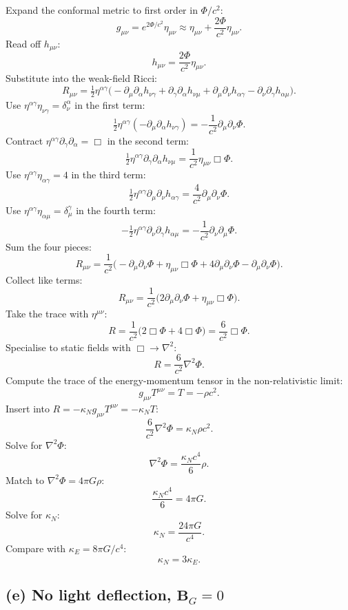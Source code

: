 \documentclass[11pt]{article}
\newcommand{\Lap}{\nabla^{2}}
\renewcommand{\vb}[1]{\mathbf{#1}}
\begin{document}
Expand the conformal metric to first order in $\Phi/c^{2}$:
\[
g_{\mu\nu}=e^{2\Phi/c^{2}}\eta_{\mu\nu}\approx \eta_{\mu\nu}+\frac{2\Phi}{c^{2}}\eta_{\mu\nu}.
\]
Read off $h_{\mu\nu}$:
\[
h_{\mu\nu}=\frac{2\Phi}{c^{2}}\eta_{\mu\nu}.
\]
Substitute into the weak-field Ricci:
\[
R_{\mu\nu}=\tfrac{1}{2}\eta^{\alpha\gamma}\bigl(-\partial_{\mu}\partial_{\alpha}h_{\nu\gamma}+\partial_{\gamma}\partial_{\alpha}h_{\nu\mu}+\partial_{\mu}\partial_{\nu}h_{\alpha\gamma}-\partial_{\nu}\partial_{\gamma}h_{\alpha\mu}\bigr).
\]
Use $\eta^{\alpha\gamma}\eta_{\nu\gamma}=\delta^{\alpha}_{\nu}$ in the first term:
\[
\tfrac{1}{2}\eta^{\alpha\gamma}(-\partial_{\mu}\partial_{\alpha}h_{\nu\gamma})=-\frac{1}{c^{2}}\partial_{\mu}\partial_{\nu}\Phi.
\]
Contract $\eta^{\alpha\gamma}\partial_{\gamma}\partial_{\alpha}=\Box$ in the second term:
\[
\tfrac{1}{2}\eta^{\alpha\gamma}\partial_{\gamma}\partial_{\alpha}h_{\nu\mu}=\frac{1}{c^{2}}\eta_{\mu\nu}\Box\Phi.
\]
Use $\eta^{\alpha\gamma}\eta_{\alpha\gamma}=4$ in the third term:
\[
\tfrac{1}{2}\eta^{\alpha\gamma}\partial_{\mu}\partial_{\nu}h_{\alpha\gamma}=\frac{4}{c^{2}}\partial_{\mu}\partial_{\nu}\Phi.
\]
Use $\eta^{\alpha\gamma}\eta_{\alpha\mu}=\delta^{\gamma}_{\mu}$ in the fourth term:
\[
-\tfrac{1}{2}\eta^{\alpha\gamma}\partial_{\nu}\partial_{\gamma}h_{\alpha\mu}=-\frac{1}{c^{2}}\partial_{\nu}\partial_{\mu}\Phi.
\]
Sum the four pieces:
\[
R_{\mu\nu}=\frac{1}{c^{2}}\bigl(-\partial_{\mu}\partial_{\nu}\Phi+\eta_{\mu\nu}\Box\Phi+4\partial_{\mu}\partial_{\nu}\Phi-\partial_{\mu}\partial_{\nu}\Phi\bigr).
\]
Collect like terms:
\[
R_{\mu\nu}=\frac{1}{c^{2}}\bigl(2\partial_{\mu}\partial_{\nu}\Phi+\eta_{\mu\nu}\Box\Phi\bigr).
\]
Take the trace with $\eta^{\mu\nu}$:
\[
R=\frac{1}{c^{2}}\bigl(2\Box\Phi+4\Box\Phi\bigr)=\frac{6}{c^{2}}\Box\Phi.
\]
Specialise to static fields with $\Box\to\Lap$:
\[
R=\frac{6}{c^{2}}\Lap\Phi.
\]
Compute the trace of the energy-momentum tensor in the non-relativistic limit:
\[
g_{\mu\nu}T^{\mu\nu}=T=-\rho c^{2}.
\]
Insert into $R=-\kappa_{N}g_{\mu\nu}T^{\mu\nu}=-\kappa_{N}T$:
\[
\frac{6}{c^{2}}\Lap\Phi=\kappa_{N}\rho c^{2}.
\]
Solve for $\Lap\Phi$:
\[
\Lap\Phi=\frac{\kappa_{N}c^{4}}{6}\rho.
\]
Match to $\Lap\Phi=4\pi G\rho$:
\[
\frac{\kappa_{N}c^{4}}{6}=4\pi G.
\]
Solve for $\kappa_{N}$:
\[
\kappa_{N}=\frac{24\pi G}{c^{4}}.
\]
Compare with $\kappa_{E}=8\pi G/c^{4}$:
\begin{equation}
\boxed{\;\kappa_{N}=3\kappa_{E}.\;}
\label{eq:kappaN}
\end{equation}

\subsection*{(e) No light deflection, $\vb B_{G}=0$}
\end{document}
